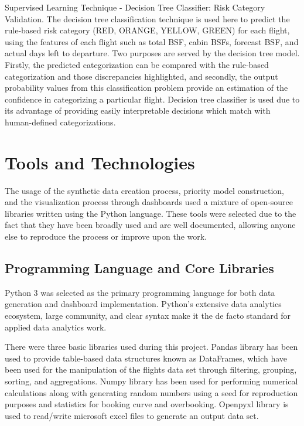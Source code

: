 Supervised Learning Technique - Decision Tree Classifier: Risk Category Validation. The decision tree classification technique is used here to predict the rule-based risk category (RED, ORANGE, YELLOW, GREEN) for each flight, using the features of each flight such as total BSF, cabin BSFs, forecast BSF, and actual days left to departure. Two purposes are served by the decision tree model. Firstly, the predicted categorization can be compared with the rule-based categorization and those discrepancies highlighted, and secondly, the output probability values from this classification problem provide an estimation of the confidence in categorizing a particular flight. Decision tree classifier is used due to its advantage of providing easily interpretable decisions which match with human-defined categorizations.

\section{Tools and Technologies}

The usage of the synthetic data creation process, priority model construction, and the visualization process through dashboards used a mixture of open-source libraries written using the Python language. These tools were selected due to the fact that they have been broadly used and are well documented, allowing anyone else to reproduce the process or improve upon the work.

\subsection{Programming Language and Core Libraries}

Python 3 was selected as the primary programming language for both data generation and dashboard implementation. Python's extensive data analytics ecosystem, large community, and clear syntax make it the de facto standard for applied data analytics work.

There were three basic libraries used during this project. Pandas library has been used to provide table-based data structures known as DataFrames, which have been used for the manipulation of the flights data set through filtering, grouping, sorting, and aggregations. Numpy library has been used for performing numerical calculations along with generating random numbers using a seed for reproduction purposes and statistics for booking curve and overbooking. Openpyxl library is used to read/write microsoft excel files to generate an output data set.

